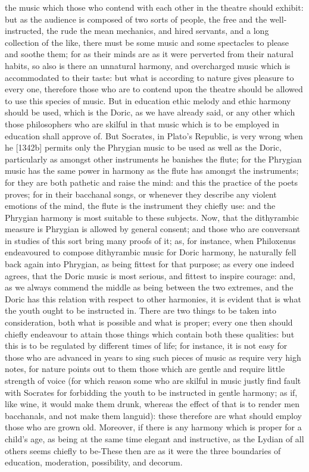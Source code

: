 the music which those who contend with each other in the theatre should
exhibit: but as the audience is composed of two sorts of people, the free
and the well-instructed, the rude the mean mechanics, and hired servants,
and a long collection of the like, there must be some music and some
spectacles to please and soothe them; for as their minds are as it were
perverted from their natural habits, so also is there an unnatural
harmony, and overcharged music which is accommodated to their taste: but
what is according to nature gives pleasure to every one, therefore those
who are to contend upon the theatre should be allowed to use this species
of music. But in education ethic melody and ethic harmony should be used,
which is the Doric, as we have already said, or any other which those
philosophers who are skilful in that music which is to be employed in
education shall approve of. But Socrates, in Plato's Republic, is very
wrong when he [1342b] permits only the Phrygian music to be used as well
as the Doric, particularly as amongst other instruments he banishes the
flute; for the Phrygian music has the same power in harmony as the flute
has amongst the instruments; for they are both pathetic and raise the
mind: and this the practice of the poets proves; for in their bacchanal
songs, or whenever they describe any violent emotions of the mind, the
flute is the instrument they chiefly use: and the Phrygian harmony is most
suitable to these subjects. Now, that the dithyrambic measure is Phrygian
is allowed by general consent; and those who are conversant in studies of
this sort bring many proofs of it; as, for instance, when Philoxenus
endeavoured to compose dithyrambic music for Doric harmony, he naturally
fell back again into Phrygian, as being fittest for that purpose; as every
one indeed agrees, that the Doric music is most serious, and fittest to
inspire courage: and, as we always commend the middle as being between the
two extremes, and the Doric has this relation with respect to other
harmonies, it is evident that is what the youth ought to be instructed in.
There are two things to be taken into consideration, both what is possible
and what is proper; every one then should chiefly endeavour to attain
those things which contain both these qualities: but this is to be
regulated by different times of life; for instance, it is not easy for
those who are advanced in years to sing such pieces of music as require
very high notes, for nature points out to them those which are gentle and
require little strength of voice (for which reason some who are skilful in
music justly find fault with Socrates for forbidding the youth to be
instructed in gentle harmony; as if, like wine, it would make them drunk,
whereas the effect of that is to render men bacchanals, and not make them
languid): these therefore are what should employ those who are grown old.
Moreover, if there is any harmony which is proper for a child's age, as
being at the same time elegant and instructive, as the Lydian of all
others seems chiefly to be-These then are as it were the three boundaries
of education, moderation, possibility, and decorum.

